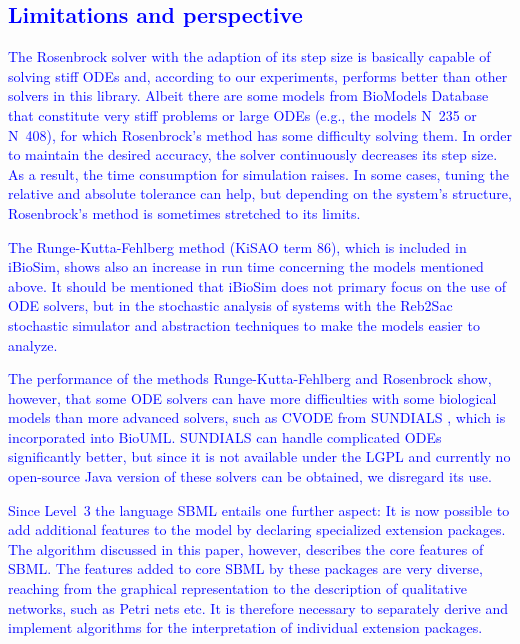 \documentclass[10pt]{bmc_article}
\newcommand{\numero}{\mbox{N\hspace{-0.075em}\raisebox{0.25em}{\relsize{-2}\b{o}}}}
\newenvironment{bmcformat}{\fussy\setboolean{publ}{true}}{\fussy}
\newcommand{\COR}[1]                      {\textcolor{blue}{#1}}
\begin{document}
\begin{bmcformat}
\subsection*{\COR{Limitations and perspective}}

\COR{The Rosenbrock solver with the adaption of its step size is basically capable of solving stiff \acsp{ODE} and, according to our experiments, performs better than other solvers in this library.
Albeit there are some models from BioModels Database that constitute very stiff problems or large \acsp{ODE} (e.g., the models \numero~235 or \numero~408), for which Rosenbrock's method has some difficulty solving them.
In order to maintain the desired accuracy, the solver continuously decreases its step size.
As a result, the time consumption for simulation raises.
In some cases, tuning the relative and absolute tolerance can help, but depending on the system's structure, Rosenbrock's method is sometimes stretched to its limits.}

\COR{The Runge-Kutta-Fehlberg method \cite{Fehlberg1970} (\acs{KiSAO} term 86), which is included in iBioSim, shows also an increase in run time concerning the models mentioned above.
It should be mentioned that iBioSim does not primary focus on the use of \acs{ODE} solvers, but in the stochastic analysis of systems with the Reb2Sac stochastic simulator and abstraction techniques to make the models easier to analyze.}

\COR{The performance of the methods Runge-Kutta-Fehlberg and Rosenbrock show, however, that some \acs{ODE} solvers can have more difficulties with some biological models than
more advanced solvers, such as \textsc{CVODE} from \textsc{SUNDIALS} \cite{Hindmarsh2005}, which is incorporated into BioUML. 
\textsc{SUNDIALS} can handle complicated \acsp{ODE} significantly better, but since it is not available under the \acs{LGPL} and currently no open-source Java version of these solvers can be obtained, we disregard its use.}

\COR{Since Level~3 the language \acs{SBML} entails one further aspect:
It is now possible to add additional features to the model by declaring specialized extension packages.
The algorithm discussed in this paper, however, describes the core features of \acs{SBML}.
The features added to core \acs{SBML} by these packages are very diverse,
reaching from the graphical representation \cite{Gauges2006} to the description
of qualitative networks, such as Petri nets \cite{Chaouiya2012} etc. 
It is therefore necessary to separately derive and implement algorithms for the interpretation of individual extension packages.}


\end{bmcformat}
\end{document}

